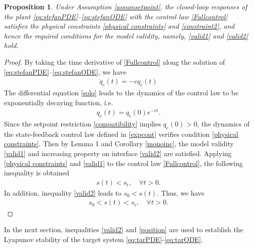\documentclass[journal]{IEEEtran}
\newtheorem{prop}{Proposition}
\begin{document}
\begin{prop}
Under Assumption \ref{assumsetpoint}, the closed-loop responses of the plant \eqref{eq:stefanPDE}--\eqref{eq:stefanODE} with the control law \eqref{Fullcontrol} satisfies the physical constraints \eqref{physical constraints} and \eqref{constraint2}, and hence the required conditions for the model validity, namely, \eqref{valid1} and \eqref{valid2} hold. 
\end{prop}
\begin{proof}
By taking the time derivative of \eqref{Fullcontrol} along the solution of \eqref{eq:stefanPDE}--\eqref{eq:stefanODE}, we have
\begin{align}
\dot{q}_{{\mathrm c}}(t)=-cq_{{\mathrm c}}(t)\label{solq}
\end{align}
The differential equation \eqref{solq} leads to the dynamics of the control law to be exponentially decaying function, i.e.  
\begin{align}\label{expcont}
q_{{\mathrm c}}(t)=q_{{\mathrm c}}(0)e^{-ct}. 
\end{align}
Since the setpoint restriction \eqref{compatibility} implies $q_{{\mathrm c}}(0)>0$, the dynamics of the state-feedback control law defined in  \eqref{expcont} verifies condition \eqref{physical constraints}. Then by Lemma 1 and Corollary \ref{monoinc}, the model validity \eqref{valid1} and increasing property on interface \eqref{valid2} are satisfied. Applying \eqref{physical constraints} and \eqref{valid1} to the control law \eqref{Fullcontrol}, the following inequality is obtained
\begin{align}
s(t)<s_{{\mathrm r}},\quad \forall t>0\label{eq:error}.
\end{align}
In addition,  inequality \eqref{valid2}  leads to $s_0< s(t)$. Thus, we have
 \begin{align}\label{position}
s_0<s(t)<s_{{\mathrm r}}, \quad \forall t>0.  
\end{align}
\end{proof}
In the next section,  inequalities  \eqref{valid2} and \eqref{position}  are used to establish the Lyapunov stability of the target system   \eqref{eq:tarPDE}-\eqref{eq:tarODE}. 
\end{document}
